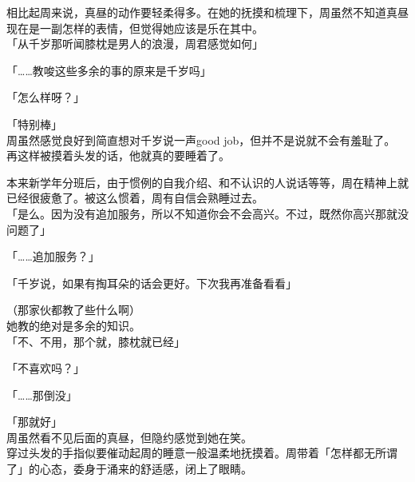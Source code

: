 相比起周来说，真昼的动作要轻柔得多。在她的抚摸和梳理下，周虽然不知道真昼现在是一副怎样的表情，但觉得她应该是乐在其中。\\

「从千岁那听闻膝枕是男人的浪漫，周君感觉如何」

「……教唆这些多余的事的原来是千岁吗」

「怎么样呀？」

「特别棒」\\

周虽然感觉良好到简直想对千岁说一声good job，但并不是说就不会有羞耻了。\\

再这样被摸着头发的话，他就真的要睡着了。

本来新学年分班后，由于惯例的自我介绍、和不认识的人说话等等，周在精神上就已经很疲惫了。被这么惯着，周有自信会熟睡过去。\\

「是么。因为没有追加服务，所以不知道你会不会高兴。不过，既然你高兴那就没问题了」

「……追加服务？」

「千岁说，如果有掏耳朵的话会更好。下次我再准备看看」

（那家伙都教了些什么啊）\\

她教的绝对是多余的知识。\\

「不、不用，那个就，膝枕就已经」

「不喜欢吗？」

「……那倒没」

「那就好」\\

周虽然看不见后面的真昼，但隐约感觉到她在笑。\\

穿过头发的手指似要催动起周的睡意一般温柔地抚摸着。周带着「怎样都无所谓了」的心态，委身于涌来的舒适感，闭上了眼睛。
